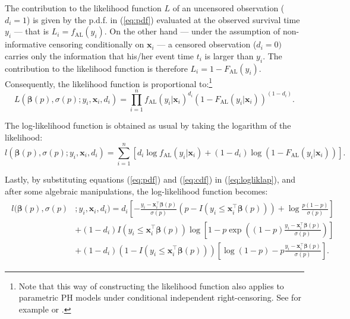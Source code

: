 The contribution to the likelihood function $L$ of an uncensored observation ($d_i=1$) is given by the p.d.f. in (\ref{eq:pdf}) evaluated at the observed survival time $y_i$ --- that is $L_i=f_{\textrm{AL}}(y_i)$. On the other hand --- under the assumption of non-informative censoring conditionally on $\mathbf{x}_i$ --- a censored observation ($d_i=0)$  carries only the information that his/her event time $t_i$ is larger than $y_i$. The contribution to the likelihood function is therefore $L_i=1-F_{\textrm{AL}}(y_i)$. Consequently, the likelihood function is proportional to:\footnote{Note that this way of constructing the likelihood function also applies to parametric PH models under conditional independent right-censoring. See for example \citet[chapter~5]{lawless_statistical_2003} or \citet[chapter~3]{kalbfleisch_statistical_2002}.}
\begin{equation*}
L(\boldsymbol{\beta}(p), \sigma(p);y_i, \mathbf{x}_i, d_i)= \prod_{i=1}^n f_{\textrm{AL}}(y_i|\mathbf{x}_i)^{d_i} \left(1-F_{\textrm{AL}}(y_i|\mathbf{x}_i)\right)^{(1-d_i)}.
\end{equation*}

The log-likelihood function is obtained as usual by taking the logarithm of the likelihood:
\begin{equation}
l(\boldsymbol{\beta}(p), \sigma(p);y_i, \mathbf{x}_i, d_i)= \sum_{i=1}^n \left[ d_i \log f_{\textrm{AL}}(y_i|\mathbf{x}_i) + \left(1-d_i\right) \log \left(1-F_{\textrm{AL}}(y_i|\mathbf{x}_i)\right) \right].
\label{eq:logliklap}
\end{equation}

Lastly, by substituting equations (\ref{eq:pdf}) and (\ref{eq:cdf}) in (\ref{eq:logliklap}), and after some algebraic manipulations, the log-likelihood function becomes:
\begin{align}
\begin{split}
l(\boldsymbol{\beta}(p), \sigma(p)&;y_i, \mathbf{x}_i, d_i)= d_i \left[ -\frac{y_i-\mathbf{x}_i^\top\boldsymbol{\beta}(p)}{\sigma(p)} \left(p-I\left(y_i\le\mathbf{x}_i^\top\boldsymbol{\beta}(p)\right) \right) + \log\frac{p\left(1-p\right)}{\sigma(p)} \right] \\ 
&+\left(1-d_i\right) I\left(y_i\le\mathbf{x}_i^\top\boldsymbol{\beta}(p)\right) \log\left[1 - p \exp\left( (1-p)  \frac{y_i-\mathbf{x}_i^\top\boldsymbol{\beta}(p)}{\sigma(p)} \right) \right] \\ 
&+ \left(1-d_i\right) \left(1-I\left(y_i\le\mathbf{x}_i^\top\boldsymbol{\beta}(p)\right)\right) \left[ \log \left(1-p\right) - p \frac{y_i-\mathbf{x}_i^\top\boldsymbol{\beta}(p)}{\sigma(p)} \right].
\label{eq:logliklapexpanded}
\end{split}
\end{align}

